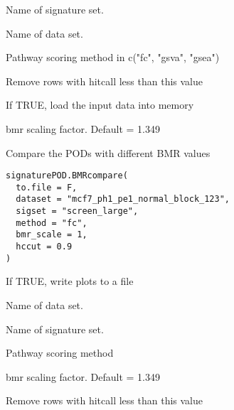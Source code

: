 \documentclass[letterpaper]{book}
\begin{document}
%
\begin{Arguments}
\begin{ldescription}
\item[\code{sigset}] Name of signature set.

\item[\code{dataset}] Name of data set.

\item[\code{method}] Pathway scoring method in c("fc", "gsva", "gsea")

\item[\code{hccut}] Remove rows with hitcall less than this value

\item[\code{do.laod}] If TRUE, load the input data into memory

\item[\code{bmr\_scale}] bmr scaling factor. Default = 1.349
\end{ldescription}
\end{Arguments}
%
\begin{Description}\relax
Compare the PODs with different BMR values
\end{Description}
%
\begin{Usage}
\begin{verbatim}
signaturePOD.BMRcompare(
  to.file = F,
  dataset = "mcf7_ph1_pe1_normal_block_123",
  sigset = "screen_large",
  method = "fc",
  bmr_scale = 1,
  hccut = 0.9
)
\end{verbatim}
\end{Usage}
%
\begin{Arguments}
\begin{ldescription}
\item[\code{to.file}] If TRUE, write plots to a file

\item[\code{dataset}] Name of data set.

\item[\code{sigset}] Name of signature set.

\item[\code{method}] Pathway scoring method

\item[\code{bmr\_scale}] bmr scaling factor. Default = 1.349

\item[\code{hccut}] Remove rows with hitcall less than this value
\end{ldescription}
\end{Arguments}
\end{document}
